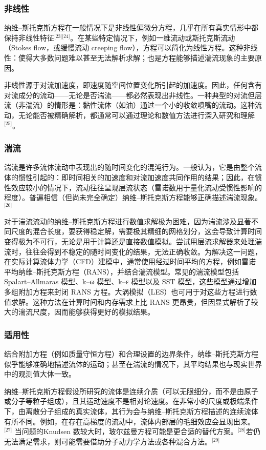 \subsubsection{非线性}
纳维–斯托克斯方程在一般情况下是非线性偏微分方程，几乎在所有真实情形中都保持非线性特征\(^\text{[23][24]}\)。在某些特定情况下，例如一维流动或斯托克斯流动（Stokes flow，或缓慢流动 creeping flow），方程可以简化为线性方程。这种非线性：使得大多数问题难以甚至无法解析求解；也是方程能够描述湍流现象的主要原因。

非线性源于对流加速度，即速度随空间位置变化所引起的加速度。因此，任何含有对流成分的流动——无论是否湍流——都必然表现出非线性。一种典型的对流但层流（非湍流）的情形是：黏性流体（如油）通过一个小的收敛喷嘴的流动。这种流动，无论能否被精确解析，都通常可以通过理论和数值方法进行深入研究和理解\(^\text{[25]}\)。
\subsubsection{湍流}
湍流是许多流体流动中表现出的随时间变化的混沌行为。一般认为，它是由整个流体的惯性引起的：即时间相关的加速度和对流加速度共同作用的结果；因此，在惯性效应较小的情况下，流动往往呈现层流状态（雷诺数用于量化流动受惯性影响的程度）。普遍相信（但尚未完全确定）纳维–斯托克斯方程能够正确描述湍流现象。\(^\text{[26]}\)

对于湍流流动的纳维–斯托克斯方程进行数值求解极为困难，因为湍流涉及显著不同尺度的混合长度，要获得稳定解，需要极其精细的网格划分，这会导致计算时间变得极为不可行，无论是用于计算还是直接数值模拟。尝试用层流求解器来处理湍流时，往往会得到不稳定的随时间变化的结果，无法正确收敛。为解决这一问题，在实际计算流体力学（CFD）建模中，通常使用经过时间平均的方程，例如雷诺平均纳维–斯托克斯方程（RANS），并结合湍流模型。常见的湍流模型包括 Spalart–Allmaras 模型、k–ω 模型、k–ε 模型以及 SST 模型，这些模型通过增加多组附加方程来封闭 RANS 方程。大涡模拟（LES）也可用于对这些方程进行数值求解。这种方法在计算时间和内存需求上比 RANS 更昂贵，但因显式解析了较大的湍流尺度，因而能够获得更好的模拟结果。
\subsubsection{适用性}
结合附加方程（例如质量守恒方程）和合理设置的边界条件，纳维–斯托克斯方程似乎能够准确地描述流体的运动；甚至在湍流的情况下，其平均结果也与现实世界中的观测值大体一致。

纳维–斯托克斯方程假设所研究的流体是连续介质（可以无限细分，而不是由原子或分子等粒子组成），且其运动速度不是相对论速度。在非常小的尺度或极端条件下，由离散分子组成的真实流体，其行为会与纳维–斯托克斯方程描述的连续流体有所不同。例如，在存在高梯度的流动中，流体内部层的毛细效应会显现出来。\(^\text{[27]}\) 当问题的Knudsen 数较大时，玻尔兹曼方程可能是更合适的替代方案。\(^\text{[28]}\)若仍无法满足需求，则可能需要借助分子动力学方法或各种混合方法。\(^\text{[29]}\)

